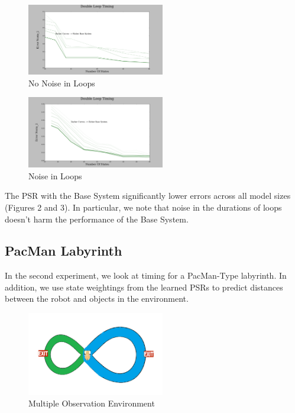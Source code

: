 \documentclass{acm_proc_article-sp}
\begin{document}
\begin{figure}[ht!]
\centering
\includegraphics[width=60mm]{lucasplots/monImages/DoubleLoopTiming0.png}
\caption{No Noise in Loops \label{overflow}}
\end{figure}

\begin{figure}[ht!]
\centering
\includegraphics[width=60mm]{lucasplots/monImages/DoubleLoopTiming0_1.png}
\caption{Noise in Loops \label{overflow}}
\end{figure}

The PSR with the Base System significantly lower errors across all model sizes (Figures 2 and 3). In particular, we note that noise in the durations of loops doesn't harm the performance of the Base System.

\subsection{PacMan Labyrinth}

In the second experiment, we look at timing for a PacMan-Type labyrinth. In addition, we use state weightings from the learned PSRs to predict distances between the robot and objects in the environment. 

\begin{figure}[ht!]
\centering
\includegraphics[width=60mm]{lucasplots/monImages/doubleLoopImageMO.png}
\caption{Multiple Observation Environment \label{overflow}}
\end{figure}
\end{document}
